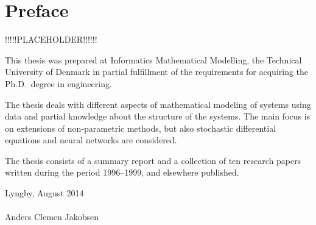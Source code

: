 \chapter{Preface}

!!!!!PLACEHOLDER!!!!!!

This thesis was prepared at Informatics Mathematical Modelling,
the Technical University of Denmark in partial fulfillment of the
requirements for acquiring the Ph.D.\ degree in engineering.

The thesis deals with different aspects of mathematical modeling of
systems using data and partial knowledge about the structure of the
systems.  The main focus is on extensions of non-parametric methods,
but also stochastic differential equations and neural networks are
considered.

The thesis consists of a summary report and a collection of ten
research papers written during the period 1996--1999, and elsewhere
published.

\vspace{20mm}
\mbox{}\hfill
\begin{minipage}[t]{80mm}
  Lyngby, August 2014
  \\ \\
  Anders Clemen Jakobsen
\end{minipage}
